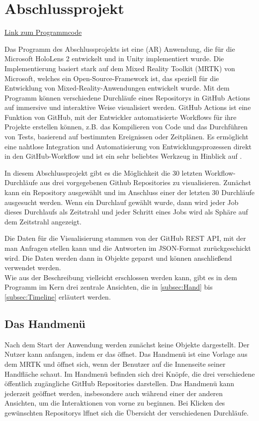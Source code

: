 \documentclass[a4paper]{article}
\begin{document}
\section{Abschlussprojekt}
\href{https://github.com/RothRobe/FST_Abschlussprojekt}{Link zum Programmcode} 

Das Programm des Abschlussprojekts ist eine  (AR) Anwendung, die für die Microsoft HoloLens 2 entwickelt und in Unity implementiert wurde. Die Implementierung basiert stark auf dem Mixed Reality Toolkit (MRTK) von Microsoft, welches ein Open-Source-Framework ist, das speziell für die Entwicklung von Mixed-Reality-Anwendungen entwickelt wurde. Mit dem Programm können verschiedene Durchläufe eines Repositorys in GitHub Actions auf immersive und interaktive Weise visualisiert werden. GitHub Actions ist eine Funktion von GitHub, mit der Entwickler automatisierte Workflows für ihre Projekte erstellen können, z.B. das Kompilieren von Code und das Durchführen von Tests, basierend auf bestimmten Ereignissen oder Zeitplänen. Es ermöglicht eine nahtlose Integration und Automatisierung von Entwicklungsprozessen direkt in den GitHub-Workflow und ist ein sehr beliebtes Werkzeug in Hinblick auf . 

In diesem Abschlussprojekt gibt es die Möglichkeit die 30 letzten Workflow-Durchläufe aus drei vorgegebenen Github Repositories zu visualisieren. Zunächst kann ein Repository ausgewählt und im Anschluss einer der letzten 30 Durchläufe ausgesucht werden. Wenn ein Durchlauf gewählt wurde, dann wird jeder Job dieses Durchlaufs als Zeitstrahl und jeder Schritt eines Jobs wird als Sphäre auf dem Zeitstrahl angezeigt.

Die Daten für die Visualisierung stammen von der GitHub REST API, mit der man Anfragen stellen kann und die Antworten im JSON-Format zurückgeschickt wird. Die Daten werden dann in Objekte geparst und können anschließend verwendet werden.\\
Wie aus der Beschreibung vielleicht erschlossen werden kann, gibt es in dem Programm im Kern drei zentrale Ansichten, die in \autoref{subsec:Hand} bis \autoref{subsec:Timeline} erläutert werden.

\subsection{Das Handmenü}
\label{subsec:Hand}
Nach dem Start der Anwendung werden zunächst keine Objekte dargestellt. Der Nutzer kann anfangen, indem er das  öffnet. Das Handmenü ist eine Vorlage aus dem MRTK und öffnet sich, wenn der Benutzer auf die Innenseite seiner Handfläche schaut. Im Handmenü befinden sich drei Knöpfe, die drei verschiedene öffentlich zugängliche GitHub Repositories darstellen. Das Handmenü kann jederzeit geöffnet werden, insbesondere auch während einer der anderen Ansichten, um die Interaktionen von vorne zu beginnen. Bei Klicken des gewünschten Repositorys lffnet sich die Übersicht der verschiedenen Durchläufe.
\end{document}

